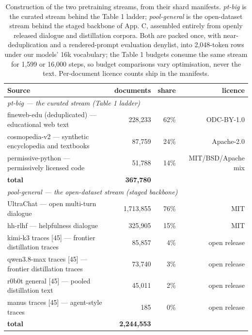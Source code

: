 \documentclass{article}
\begin{document}
\begin{table}[htbp]
\caption{Construction of the two pretraining streams, from their shard manifests. \emph{pt-big} is the curated stream behind the Table 1 ladder; \emph{pool-general} is the open-dataset stream behind the staged backbone of App. C, assembled entirely from openly released dialogue and distillation corpora. Both are packed once, with near-deduplication and a rendered-prompt evaluation denylist, into 2,048-token rows under our models' 16k vocabulary; the Table 1 budgets consume the same stream for 1,599 or 16,000 steps, so budget comparisons vary optimisation, never the text. Per-document licence counts ship in the manifests.}
\label{tab:pretrain_sources}
\centering
\footnotesize
\begin{tabular}{lrrr}
\toprule
Source & documents & share & licence \\
\midrule
\multicolumn{4}{l}{\emph{pt-big --- the curated stream (Table 1 ladder)}} \\
\midrule
fineweb-edu (deduplicated) --- educational web text & 228,233 & 62\% & ODC-BY-1.0 \\
cosmopedia-v2 --- synthetic encyclopedia and textbooks & 87,759 & 24\% & Apache-2.0 \\
permissive-python --- permissively licensed code & 51,788 & 14\% & MIT/BSD/Apache mix \\
\textbf{total} & \textbf{367,780} &  &  \\
\midrule
\multicolumn{4}{l}{\emph{pool-general --- the open-dataset stream (staged backbone)}} \\
\midrule
UltraChat --- open multi-turn dialogue & 1,713,855 & 76\% & MIT \\
hh-rlhf --- helpfulness dialogue & 325,905 & 15\% & MIT \\
kimi-k3 traces [45] --- frontier distillation traces & 85,857 & 4\% & open release \\
qwen3.8-max traces [45] --- frontier distillation traces & 73,740 & 3\% & open release \\
r0b0t general [45] --- pooled distillation text & 45,011 & 2\% & open release \\
manus traces [45] --- agent-style traces & 185 & 0\% & open release \\
\textbf{total} & \textbf{2,244,553} &  &  \\
\bottomrule
\end{tabular}
\end{table}
\end{document}
